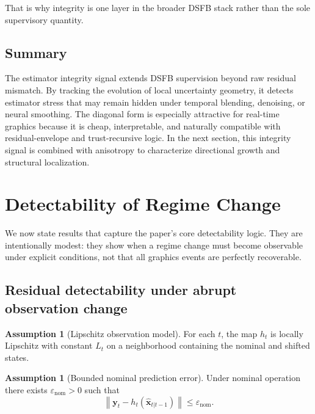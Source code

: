 \documentclass[11pt,letterpaper]{article}
\newcommand{\state}{\mathbf{x}}
\newcommand{\obs}{\mathbf{y}}
\newcommand{\norm}[1]{\left\lVert #1 \right\rVert}
\theoremstyle{gcresult}
\theoremstyle{definition}
\newtheorem{assumption}[theorem]{Assumption}
\begin{document}
That is why integrity is one layer in the broader DSFB stack rather than the sole supervisory quantity.


\subsection{Summary}

The estimator integrity signal extends DSFB supervision beyond raw residual mismatch. By tracking the evolution of local uncertainty geometry, it detects estimator stress that may remain hidden under temporal blending, denoising, or neural smoothing. The diagonal form is especially attractive for real-time graphics because it is cheap, interpretable, and naturally compatible with residual-envelope and trust-recursive logic. In the next section, this integrity signal is combined with anisotropy to characterize directional growth and structural localization.

\section{Detectability of Regime Change}

We now state results that capture the paper's core detectability logic. They are intentionally modest: they show when a regime change must become observable under explicit conditions, not that all graphics events are perfectly recoverable.

\subsection{Residual detectability under abrupt observation change}
\begin{assumption}[Lipschitz observation model]
For each $t$, the map $h_t$ is locally Lipschitz with constant $L_t$ on a neighborhood containing the nominal and shifted states.
\end{assumption}

\begin{assumption}[Bounded nominal prediction error]
Under nominal operation there exists $\varepsilon_{\mathrm{nom}} > 0$ such that
\begin{equation}
    \norm{\obs_t - h_t(\hat{\state}_{t|t-1})} \le \varepsilon_{\mathrm{nom}}.
\end{equation}
\end{assumption}
\end{document}

